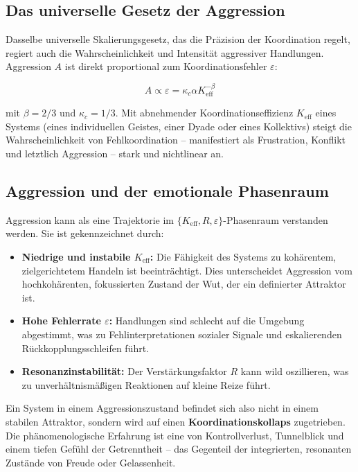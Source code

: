 \documentclass[12pt,a4paper]{article}
\begin{document}
	\subsection{Das universelle Gesetz der Aggression}
	
	Dasselbe universelle Skalierungsgesetz, das die Präzision der Koordination regelt, regiert auch die Wahrscheinlichkeit und Intensität aggressiver Handlungen. Aggression \(A\) ist direkt proportional zum Koordinationsfehler \(\varepsilon\):
	
	\begin{equation}
		A \propto \varepsilon = \kappa_c \alpha K_{\mathrm{eff}}^{-\beta}
	\end{equation}
	
	mit \(\beta = 2/3\) und \(\kappa_c = 1/3\). Mit abnehmender Koordinationseffizienz \(K_{\mathrm{eff}}\) eines Systems (eines individuellen Geistes, einer Dyade oder eines Kollektivs) steigt die Wahrscheinlichkeit von Fehlkoordination – manifestiert als Frustration, Konflikt und letztlich Aggression – stark und nichtlinear an.
	
	\subsection{Aggression und der emotionale Phasenraum}
	
	Aggression kann als eine Trajektorie im \(\{K_{\mathrm{eff}}, R, \varepsilon\}\)-Phasenraum verstanden werden. Sie ist gekennzeichnet durch:
	
	\begin{itemize}
		\item \textbf{Niedrige und instabile \(K_{\mathrm{eff}}\):} Die Fähigkeit des Systems zu kohärentem, zielgerichtetem Handeln ist beeinträchtigt. Dies unterscheidet Aggression vom hochkohärenten, fokussierten Zustand der Wut, der ein definierter Attraktor ist.
		\item \textbf{Hohe Fehlerrate \(\varepsilon\):} Handlungen sind schlecht auf die Umgebung abgestimmt, was zu Fehlinterpretationen sozialer Signale und eskalierenden Rückkopplungsschleifen führt.
		\item \textbf{Resonanzinstabilität:} Der Verstärkungsfaktor \(R\) kann wild oszillieren, was zu unverhältnismäßigen Reaktionen auf kleine Reize führt.
	\end{itemize}
	
	Ein System in einem Aggressionszustand befindet sich also nicht in einem stabilen Attraktor, sondern wird auf einen \textbf{Koordinationskollaps} zugetrieben. Die phänomenologische Erfahrung ist eine von Kontrollverlust, Tunnelblick und einem tiefen Gefühl der Getrenntheit – das Gegenteil der integrierten, resonanten Zustände von Freude oder Gelassenheit.
	
\end{document}
